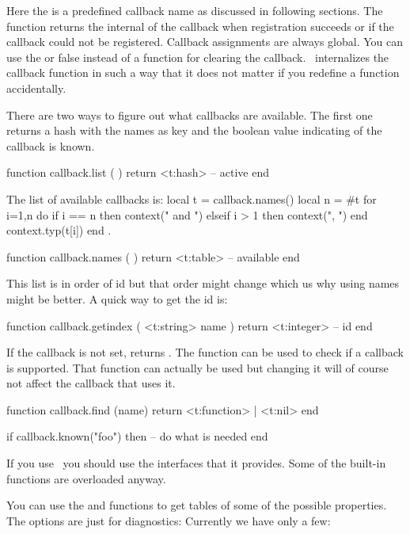 Here the  is a predefined callback name as discussed in following
sections. The function returns the internal  of the callback when
registration succeeds or  if the callback could not be registered.
Callback assignments are always global. You can use the  or \type
{false} instead of a function for clearing the callback. \LUAMETATEX\
internalizes the callback function in such a way that it does not matter if you
redefine a function accidentally.

There are two ways to figure out what callbacks are available. The first one
returns a hash with the names as key and the boolean value indicating of the
callback is known.

\starttyping[option=LUA]
function callback.list ( )
    return <t:hash> -- active
end
\stoptyping

The list of available callbacks is:
\startluacode
    local t = callback.names()
    local n = #t
    for i=1,n do
        if i == n then
            context(" and ")
        elseif i > 1 then
            context(", ")
        end
        context.typ(t[i])
    end
\stopluacode .

\starttyping[option=LUA]
function callback.names ( )
    return <t:table> -- available
end
\stoptyping

This list is in order of id but that order might change which us why using names might
be better. A quick way to get the id is:

\starttyping[option=LUA]
function callback.getindex ( <t:string> name )
    return <t:integer> -- id
end
\stoptyping

If the callback is not set,  returns . The 
function can be used to check if a callback is supported. That function can
actually be used but changing it will of course not affect the callback that uses
it.

\starttyping[option=LUA]
function callback.find (name) return
    <t:function> | <t:nil>
end
\stoptyping

\starttyping[option=LUA]
if callback.known("foo") then
    -- do what is needed
end
\stoptyping

If you use \CONTEXT\ you should use the interfaces that it provides. Some of the
built-in \type {callback} functions are overloaded anyway.

You can use the  and 
functions to get tables of some of the possible properties. The options are just for
diagnostics: Currently we have only a few:

